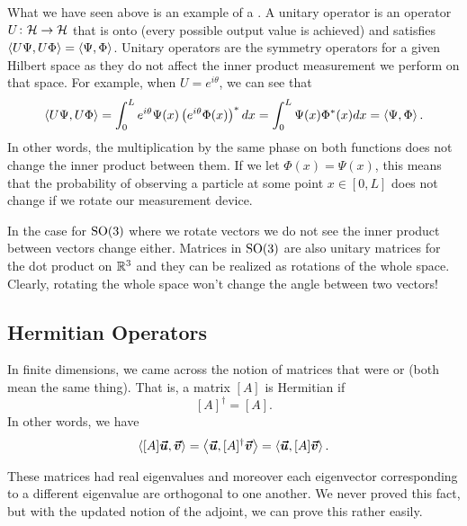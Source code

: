 What we have seen above is an example of a .  A unitary operator is an operator $U\colon \mathcal{H} \to \mathcal{H}$ that is onto (every possible output value is achieved) and satisfies $\left\langle U\Psi, U\Phi \right\rangle=\left\langle \Psi, \Phi \right\rangle$.  Unitary operators are the symmetry operators for a given Hilbert space as they do not affect the inner product measurement we perform on that space.  For example, when $U=e^{i\theta}$, we can see that
\[
\left\langle U\Psi, U\Phi \right\rangle = \int_0^L e^{i\theta}\Psi(x) \left(e^{i\theta} \Phi(x)\right)^*dx = \int_0^L \Psi(x)\Phi^*(x)dx = \left\langle \Psi, \Phi \right\rangle.
\]
In other words, the multiplication by the same phase on both functions does not change the inner product between them. If we let $\Phi(x)=\Psi(x)$, this means that the probability of observing a particle at some point $x\in [0,L]$ does not change if we rotate our measurement device.  

In the case for $\mathrm{SO}(3)$ where we rotate vectors we do not see the inner product between vectors change either.  Matrices in $\mathrm{SO}(3)$ are also unitary matrices for the dot product on $\mathbb{R}^3$ and they can be realized as rotations of the whole space.  Clearly, rotating the whole space won't change the angle between two vectors!



\subsection{Hermitian Operators}
In finite dimensions, we came across the notion of matrices that were  or  (both mean the same thing).  That is, a matrix $[A]$ is Hermitian if
\[
[A]^\dagger = [A].
\]
In other words, we have
\[
\left\langle [A]\boldsymbol{\boldsymbol{\vec{u}}}, \boldsymbol{\boldsymbol{\vec{v}}} \right\rangle = \left\langle \boldsymbol{\boldsymbol{\vec{u}}}, [A]^\dagger \boldsymbol{\boldsymbol{\vec{v}}} \right\rangle=\left\langle \boldsymbol{\boldsymbol{\vec{u}}}, [A]\boldsymbol{\boldsymbol{\vec{v}}} \right\rangle.
\]

These matrices had real eigenvalues and moreover each eigenvector corresponding to a different eigenvalue are orthogonal to one another. We never proved this fact, but with the updated notion of the adjoint, we can prove this rather easily.

